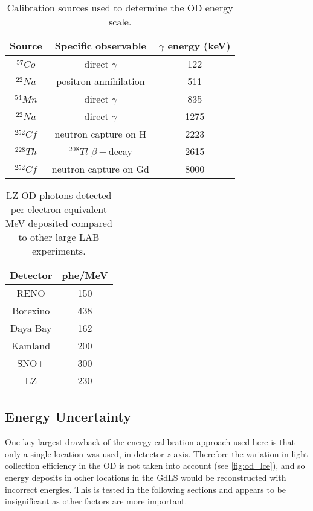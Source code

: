 \begin{table}[!htbp]%
    \centering
    \begin{tabular}{c|c|c}
        Source      & Specific observable         &  $\gamma$ energy (keV) \\ \hline
        ${}^{57}Co$ & direct $\gamma$             & 122                        \\
        ${}^{22}Na$ & positron annihilation       & 511               \\
        ${}^{54}Mn$ & direct $\gamma$             & 835                        \\
        ${}^{22}Na$ & direct $\gamma$             & 1275               \\
        ${}^{252}Cf$ & neutron capture on H       & 2223            \\
        ${}^{228}Th$ & ${}^{208}Tl$ $\beta-$decay & 2615            \\
        ${}^{252}Cf$ & neutron capture on Gd      & 8000            
        
    \end{tabular}
    \caption{Calibration sources used to determine the OD energy scale.}
    \label{tab:od_energy_calibration_sources}
\end{table}



\begin{table}[!htbp]%
    \centering
    \begin{tabular}{c|c}
        Detector & phe/MeV \\ \hline
        RENO     & 150 \cite{reno_phe_per_mev_ref} \\
        Borexino & 438 \cite{pablo_mosteiro_thesis_ref} \\
        Daya Bay & 162 \cite{dayabay_phe_per_mev_ref} \\
        Kamland  & 200 \cite{kamland_phe_per_mev_ref} \\
        SNO+     & 300 \cite{snoplus_phe_per_mev_ref} \\
        LZ       & 230 
    \end{tabular}
    \caption{LZ OD photons detected per electron equivalent MeV deposited compared to other large LAB experiments.}
    \label{tab:od_phe_per_mev_comparison}
\end{table}

\subsection{Energy Uncertainty}
\par
One key largest drawback of the energy calibration approach used here is that only a single location was used, in detector $z$-axis.
Therefore the variation in light collection efficiency in the OD is not taken into account (see \autoref{fig:od_lce}), and so energy deposits in other locations in the GdLS would be reconstructed with incorrect energies.
This is tested in the following sections and appears to be insignificant as other factors are more important.


